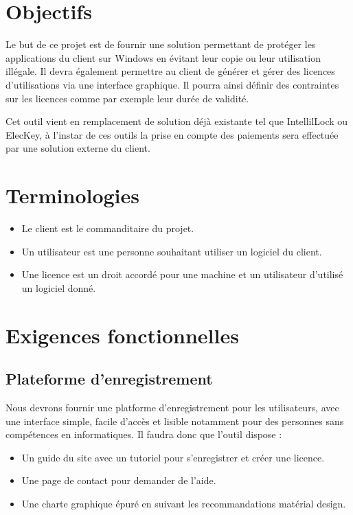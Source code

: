 \chapter{Objectifs}

Le but de ce projet est de fournir une solution permettant de protéger les applications
du client sur Windows en évitant leur copie ou leur utilisation illégale. 
Il devra également permettre au client de générer et gérer des licences d'utilisations 
via une interface graphique. Il pourra ainsi définir des contraintes sur les licences 
comme par exemple leur durée de validité. \newline

Cet outil vient en remplacement de solution déjà existante tel que IntellilLock ou ElecKey,
à l'instar de ces outils la prise en compte des paiements sera effectuée par une solution externe
du client.

\chapter{Terminologies}

\begin{itemize}
	\item Le client est le commanditaire du projet.
	\item Un utilisateur est une personne souhaitant utiliser un logiciel du client. 
	\item Une licence est un droit accordé pour une machine et un utilisateur d'utilisé un logiciel donné.
\end{itemize}

\chapter{Exigences fonctionnelles}

\section{Plateforme d'enregistrement}
Nous devrons fournir une platforme d'enregistrement pour les utilisateurs, avec une interface simple, facile d'accès et lisible notamment pour des personnes sans compétences en informatiques. Il faudra donc que l'outil dispose :
\begin{itemize}
	\item Un guide du site avec un tutoriel pour s'enregistrer et créer une licence.
	\item Une page de contact pour demander de l'aide.
	\item Une charte graphique épuré en suivant les recommandations matérial design.
\end{itemize}

